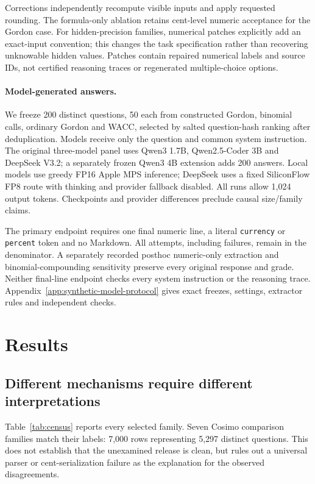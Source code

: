 Corrections independently recompute visible inputs and apply requested rounding. The formula-only ablation retains cent-level numeric acceptance for the Gordon case. For hidden-precision families, numerical
patches explicitly add an exact-input convention; this changes the task specification rather than recovering unknowable hidden values. Patches contain repaired numerical labels and source IDs, not certified
reasoning traces or regenerated multiple-choice options.

\paragraph{Model-generated answers.} We freeze 200 distinct questions, 50 each from constructed Gordon, binomial calls, ordinary Gordon and WACC, selected by salted question-hash ranking after deduplication. Models receive only the question and common system instruction. The original three-model panel uses Qwen3 1.7B, Qwen2.5-Coder 3B and DeepSeek V3.2; a separately frozen Qwen3 4B extension adds 200 answers. Local models use greedy FP16 Apple MPS inference; DeepSeek uses a fixed SiliconFlow FP8 route with thinking and provider fallback disabled. All runs allow 1,024 output tokens. Checkpoints and provider differences preclude causal size/family claims.

The primary endpoint requires one final numeric line, a literal \texttt{currency} or \texttt{percent} token and no Markdown. All attempts, including failures, remain in the denominator. A separately recorded posthoc numeric-only extraction and binomial-compounding sensitivity preserve every original response and grade. Neither final-line endpoint checks every system instruction or the reasoning trace. Appendix~\ref{app:synthetic-model-protocol} gives exact freezes, settings, extractor rules and independent checks.

\section{Results}
\subsection{Different mechanisms require different interpretations} Table~\ref{tab:census} reports every selected
family. Seven Cosimo comparison families match their labels: 7,000 rows representing 5,297 distinct questions. This does not establish that the unexamined release is clean, but rules out a universal parser or
cent-serialization failure as the explanation for the observed disagreements.

